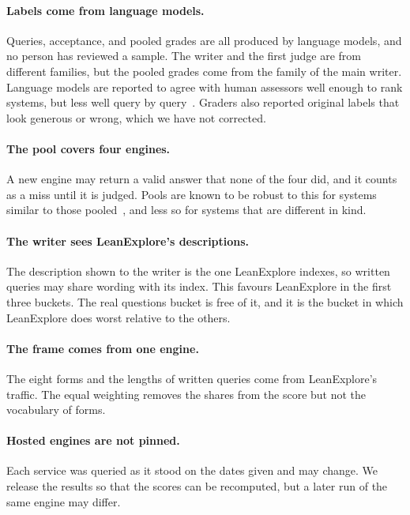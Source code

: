 \documentclass{article}
\begin{document}
\paragraph{Labels come from language models.} Queries, acceptance, and pooled
grades are all produced by language models, and no person has reviewed a
sample. The writer and the first judge are from different families, but the
pooled grades come from the family of the main writer. Language models are
reported to agree with human assessors well enough to rank systems, but less
well query by query~\cite{thomas2024llm,faggioli2023perspectives}. Graders also reported
original labels that look generous or wrong, which we have not corrected.

\paragraph{The pool covers four engines.} A new engine may return a valid
answer that none of the four did, and it counts as a miss until it is judged.
Pools are known to be robust to this for systems similar to those
pooled~\cite{zobel1998reliable,buckley2004incomplete}, and less so for systems
that are different in kind.

\paragraph{The writer sees LeanExplore's descriptions.} The description shown
to the writer is the one LeanExplore indexes, so written queries may share
wording with its index. This favours LeanExplore in the first three buckets.
The real questions bucket is free of it, and it is the bucket in which
LeanExplore does worst relative to the others.

\paragraph{The frame comes from one engine.} The eight forms and the lengths
of written queries come from LeanExplore's traffic. The equal weighting
removes the shares from the score but not the vocabulary of forms.

\paragraph{Hosted engines are not pinned.} Each service was queried as it
stood on the dates given and may change. We release the results so that the
scores can be recomputed, but a later run of the same engine may differ.
\end{document}
